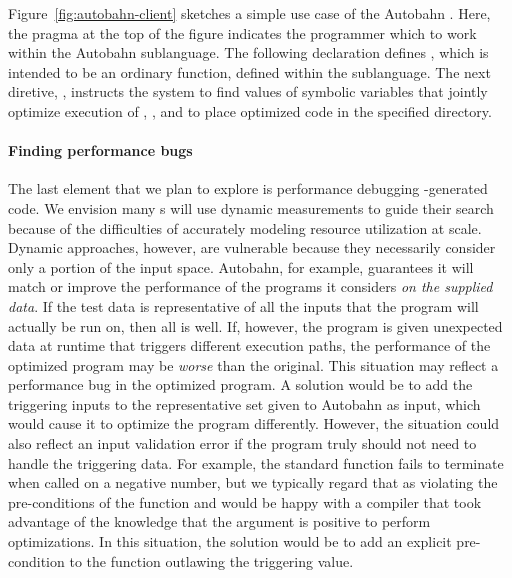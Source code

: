 Figure~\ref{fig:autobahn-client} sketches a simple use case of the Autobahn \rasp.
Here, the pragma at the top of the figure indicates the programmer which to work
within the Autobahn sublanguage.  The following declaration defines ,
which is intended to be an ordinary function, defined within the \rasp{} sublanguage.
The next diretive, , instructs the system to find values of symbolic
variables that jointly optimize execution of , , \etc{}  
and to place optimized code in the specified directory.

\paragraph*{Finding performance bugs}
The last element that we plan to explore is performance debugging
\rasp{}-generated code.  
We envision many \rasp{}s will use dynamic measurements to guide their search
because of the difficulties of accurately modeling resource utilization
at scale.  
Dynamic approaches, however, are vulnerable because they necessarily
consider only a portion of the input space.  
Autobahn, for example, guarantees it will match or improve the
performance of the programs it considers 
\textit{on the supplied data}.  If the test data is representative of
all the inputs that the program will actually be run on, then all is
well. If, however, the program is given unexpected data at runtime
that triggers different execution paths, the performance of the
optimized program may be \textit{worse} than the original.  
This situation may reflect a performance bug in the optimized
program.  A solution would be to add the triggering inputs to the
representative set given to Autobahn as input, which would cause it to
optimize the program differently.  However, the situation could also
reflect an input validation error if the program truly should not need
to handle the triggering data.  For example, the standard 
function fails to terminate when called on a negative number, but we
typically regard that as violating the pre-conditions of the function
and would be happy with a compiler that took advantage of the
knowledge that the argument is positive to perform optimizations.  In
this situation, the solution would be to add an explicit pre-condition
to the function outlawing the triggering value.  

